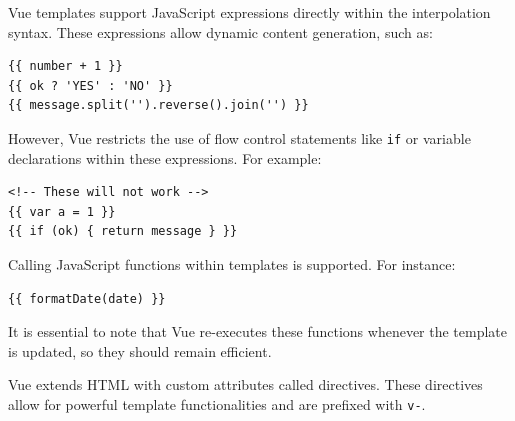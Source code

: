 Vue templates support JavaScript expressions directly within the interpolation syntax. These expressions allow dynamic content generation, such as:
\begin{verbatim}
{{ number + 1 }}
{{ ok ? 'YES' : 'NO' }}
{{ message.split('').reverse().join('') }}
\end{verbatim}
However, Vue restricts the use of flow control statements like \texttt{if} or variable declarations within these expressions. For example:
\begin{verbatim}
<!-- These will not work -->
{{ var a = 1 }}
{{ if (ok) { return message } }}
\end{verbatim}

Calling JavaScript functions within templates is supported. For instance:
\begin{verbatim}
{{ formatDate(date) }}
\end{verbatim}
It is essential to note that Vue re-executes these functions whenever the template is updated, so they should remain efficient.

Vue extends HTML with custom attributes called directives. These directives allow for powerful template functionalities and are prefixed with \texttt{v-}.

